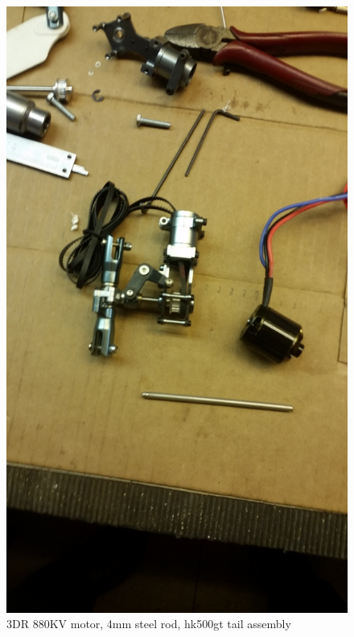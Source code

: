 \begin{figure}[h]
        \centering
         \begin{minipage}[b]{0,6\textwidth}
            \includegraphics[width =\textwidth, angle =180]{VAPIQ-PICTURES/VPQParts}
              \caption{3DR 880KV motor, 4mm steel rod, hk500gt tail assembly}
            \label{fig:nlknl}
        \end{minipage}
        \hfill
        \begin{minipage}[b]{0.35\textwidth}

\end{minipage}
\end{figure}
